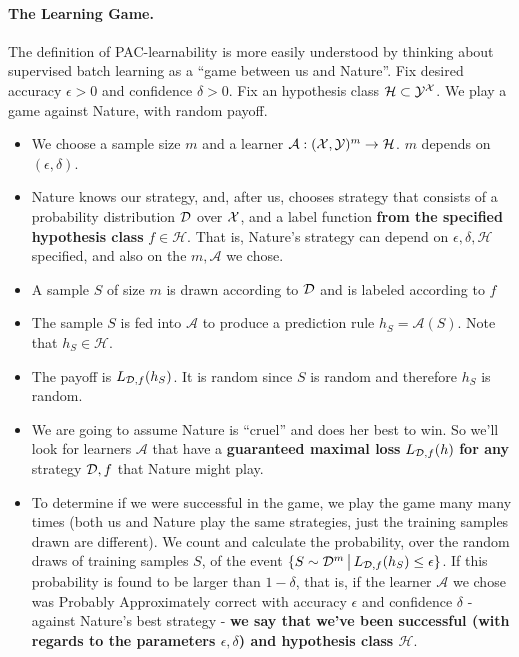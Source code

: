 \documentclass[11pt]{article}
\newcommand{\Ac}{\mathcal{A}}
\newcommand{\Hc}{\mathcal{H}}
\begin{document}
\paragraph{The Learning Game.} 
The definition of PAC-learnability is more easily understood by thinking about
supervised batch learning as a ``game between us and Nature''. 
Fix desired accuracy $\epsilon>0$ and confidence $\delta>0$. Fix
   an hypothesis class $\Hc \subset \Y^\X$. 
 We play a game against Nature, with random payoff.
  \begin{itemize}
    \item We choose a sample size $m$ and a learner $\Ac:(\X,\Y)^m \to \Hc$. 
    $m$ depends on $(\epsilon,\delta)$.
       \item Nature knows our strategy, and, after us, chooses strategy that consists of a probability distribution $\mathcal{D}$ over $\mathcal{X}$, and a label function {\bf from the specified hypothesis class} $f\in\Hc$. 
     That is, Nature's strategy can depend on $\epsilon,\delta,\Hc$ specified, and also on the $m,\Ac$ we chose. 
    \item A sample $S$ of size $m$ is drawn according to $\mathcal{D}$ and is labeled
      according to $f$
    \item The sample $S$ is fed into $\Ac$ to produce a prediction rule
      $h_S=\Ac(S)$. Note that $h_S\in\Hc$.
    \item The payoff is $L_{\mathcal{D},f}(h_S)$. It is random since $S$ is random and
      therefore $h_S$ is random.
    \item We are going to assume Nature is ``cruel'' and does her best to win.
      So we'll look for learners $\Ac$ that have a {\bf guaranteed maximal 
      loss} $L_{\mathcal{D},f}(h)$ {\bf for any} strategy $\mathcal{D},f$ that Nature might play.
      \item To determine if we were successful in the game, we play the game many many times 
      (both us and Nature play the same strategies, just the training samples drawn are different).
      We count and calculate the probability, over the random draws of training samples $S$, of the event
      $\{ S \sim \mathcal{D}^m \,\big |\,L_{\mathcal{D},f}(h_S)\leq \epsilon \}$. If this probability is found to be 
      larger than $1-\delta$, that is, if 
      the learner $\Ac$ we chose was Probably Approximately correct with accuracy $\epsilon$ and confidence $\delta$ - against Nature's best strategy - {\bf we say that we've been successful (with regards to the parameters $\epsilon,\delta$) and hypothesis class $\Hc$}.
\end{itemize}
\end{document}
